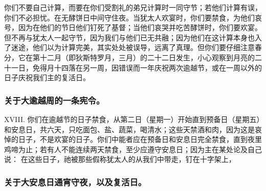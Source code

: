 你们不要自己计算，而要在你们受割礼的弟兄计算时一同守节；若他们计算有误，你们不必担忧。在无酵饼日中间守住夜。当犹太人欢宴时，你们要禁食，为他们哀号，因为在他们的节日他们钉死了基督；当他们哀哭并吃苦酵饼时，你们要欢宴。但不再与犹太人一起守节，因为我们与他们已无共融；因为他们在这计算本身也入了迷途，他们以为计算完美，其实处处被误导，远离了真理。但你们要仔细注意春分，它在第十二月（即狄斯特罗月，三月）的二十二日发生，小心观察到月亮的二十一日，免得月十四落在另一周，因错误而一年庆祝两次逾越节，或在一周以外的日子庆祝我们主的复活日。\par


\subsubsection{关于大逾越周的一条宪令。}

XVIII. 你们在逾越节的日子禁食，从第二日（星期一）开始直到预备日（星期五）和安息日，共六天，只吃面包、盐、蔬菜，喝清水；这些天禁酒和肉，因为这是哀悼的日子，不是欢宴的日子。你们中能者应在预备日和安息日完全禁食，直到夜里鸡啼为止；若有人不能连续两天禁食，至少应遵守安息日；因为主在某处论及自己说： 在这些日子，祂被那些假称犹太人的从我们中带走，钉在十字架上，\par


\subsubsection{关于大安息日通宵守夜，以及复活日。}

